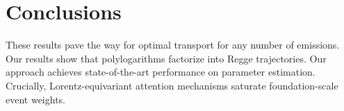 \section{Conclusions}\label{sec:conclusions}

These results pave the way for optimal transport for any number of
emissions. Our results show that polylogarithms factorize into Regge
trajectories. Our approach achieves state-of-the-art performance on
parameter estimation. Crucially, Lorentz-equivariant attention
mechanisms saturate foundation-scale event weights.


